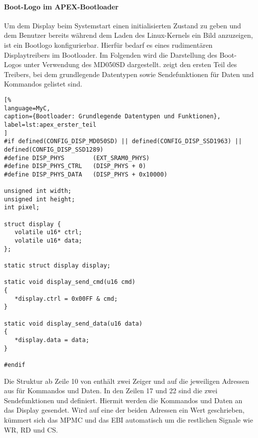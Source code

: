 \paragraph{Boot-Logo im APEX-Bootloader}
\label{cha:bootloader}
Um dem Display beim Systemstart einen initialisierten Zustand zu geben und dem Benutzer bereits während dem Laden des Linux-Kernels ein Bild anzuzeigen, ist ein Bootlogo konfigurierbar. Hierfür bedarf es eines rudimentären Displaytreibers im Bootloader. Im Folgenden wird die Darstellung des Boot-Logos unter Verwendung des MD050SD dargestellt.  zeigt den ersten Teil des Treibers, bei dem grundlegende Datentypen sowie Sendefunktionen für Daten und Kommandos gelistet sind. 

\begin{lstlisting}[%
language=MyC,
caption={Bootloader: Grundlegende Datentypen und Funktionen},
label=lst:apex_erster_teil
]
#if defined(CONFIG_DISP_MD050SD) || defined(CONFIG_DISP_SSD1963) || defined(CONFIG_DISP_SSD1289)
#define DISP_PHYS        (EXT_SRAM0_PHYS)
#define DISP_PHYS_CTRL   (DISP_PHYS + 0)
#define DISP_PHYS_DATA   (DISP_PHYS + 0x10000)

unsigned int width;
unsigned int height;
int pixel;

struct display {
   volatile u16* ctrl;
   volatile u16* data;
};

static struct display display;

static void display_send_cmd(u16 cmd)
{
   *display.ctrl = 0x00FF & cmd;
}

static void display_send_data(u16 data)
{
   *display.data = data;
}

#endif
\end{lstlisting}

Die Struktur  ab Zeile 10 von  enthält zwei Zeiger  und  auf die jeweiligen Adressen aus  für Kommandos und Daten. In den Zeilen 17 und 22 sind die zwei Sendefunktionen  und 
 definiert. Hiermit werden die Kommandos und Daten an das Display gesendet. Wird auf eine der beiden Adressen ein Wert geschrieben, kümmert sich das MPMC und das EBI automatisch um die restlichen Signale wie WR, RD und CS. 

